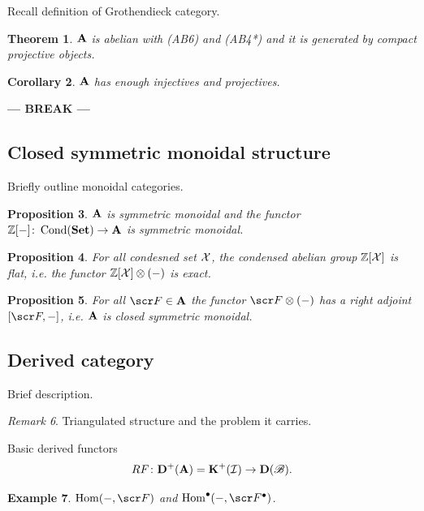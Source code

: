 \documentclass[A4paper, british, reqno]{amsart}
\theoremstyle{darkgreentheorem}
\newtheorem{thm}{Theorem}[section]
\newtheorem{prop}[thm]{Proposition}
\newtheorem{cor}[thm]{Corollary}
\theoremstyle{darkbluedefinition}
\theoremstyle{darkredexample}
\newtheorem{exa}[thm]{Example}
\theoremstyle{remark}
\newtheorem{rem}[thm]{Remark}
\DeclareMathOperator{\Hom}{Hom}
\DeclareMathOperator{\Cond}{Cond}
\newcommand{\1}{\mathbbm{1}}
\newcommand{\ot}{\otimes}
\newcommand{\grd}{^{\bullet}}
\begin{document}
Recall definition of Grothendieck category.

\begin{thm}
    $\mathbf{A}$ is abelian with (AB6) and (AB4*) and it is generated by compact projective objects.
\end{thm}

\begin{cor}
    $\mathbf{A}$ has enough injectives and projectives.
\end{cor}

\begin{center}
    \textbf{--- BREAK ---}
\end{center}

\subsection{Closed symmetric monoidal structure}

Briefly outline monoidal categories.

\begin{prop}
    $\mathbf{A}$ is symmetric monoidal and the functor $\Z[-]\colon \Cond(\Set)\to \bfA$ is symmetric monoidal.
\end{prop}

\begin{prop}
    For all condesned set $\mathcal{X}$, the condensed abelian group $\mathbb{Z}[\mathcal{X}]$ is flat, i.e. the functor $\Z[\X]\ot (-)$ is exact.
\end{prop}

\begin{prop}
    For all $\F\in\bfA$ the functor $\F\ot(-)$ has a right adjoint $[\F,-]$, i.e. $\mathbf{A}$ is closed symmetric monoidal.
\end{prop}

\subsection{Derived category}

Brief description.

\begin{rem}
    Triangulated structure and the problem it carries.
\end{rem}

Basic derived functors
\[ RF\colon \mathbf{D}^{+}(\mathbf{A})=\mathbf{K}^{+}(\mathcal{I})\to \mathbf{D}(\mathscr{B}). \]

\begin{exa}
    $\Hom(-,\F)$ and $\Hom\grd(-,\F\grd)$.
\end{exa}
\end{document}
